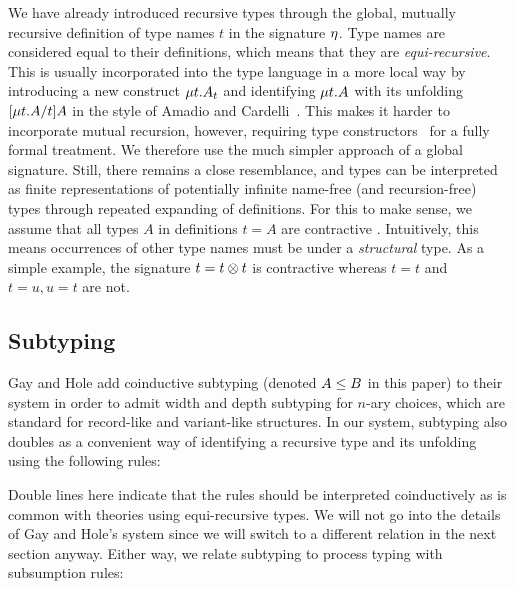 \documentclass[submission,copyright,creativecommons]{eptcs}
\newcommand{\m}[1]{\mathsf{#1}}
\begin{document}
We have already introduced recursive types through the global, mutually recursive definition of type names $t$ in the signature $\eta$.  Type names are considered equal to their definitions, which means that they are \emph{equi-recursive}.  This is usually incorporated into the type language in a more local way by introducing a new construct $\mu{t} . {A_t}$ and identifying $\mu{t} . {A}$ with its unfolding $\lbrack{\mu{t} . {A}}/{t}\rbrack{A}$ in the style of Amadio and Cardelli~\cite{AmadioC91}. This makes it harder to incorporate mutual recursion, however, requiring type constructors~\cite{Stone05un} for a fully formal treatment. We therefore use the much simpler approach of a global signature. Still, there remains a close resemblance, and types can be interpreted as finite representations of potentially infinite name-free (and recursion-free) types through repeated expanding of definitions. For this to make sense, we assume that all types $A$ in definitions $t = A$ are contractive \cite{Stone05un,
  GayH05}. Intuitively, this means occurrences of other type names must be under a \emph{structural} type. As a simple example, the signature $t = t \otimes t$ is contractive whereas $t = t$ and $t = u, u = t$ are not.

\subsection{Subtyping}
\label{original-subtyping}

Gay and Hole \cite{GayH05} add coinductive subtyping (denoted $A \le B$ in this paper) to their system in order to admit width and depth subtyping for $n$-ary choices, which are standard for record-like and variant-like structures. In our system, subtyping also doubles as a convenient way of identifying a recursive type and its unfolding using the following rules:
Double lines here indicate that the rules should be interpreted coinductively as is common with theories using equi-recursive types. We will not go into the details of Gay and Hole's system since we will switch to a different relation in the next section anyway. Either way, we relate subtyping to process typing with subsumption rules:
\end{document}
